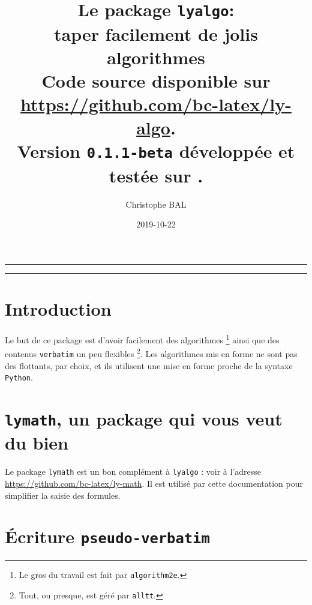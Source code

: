 \documentclass[12pt,a4paper]{article}
\theoremstyle{definition}
\begin{document}
\renewcommand\labelitemi{\raisebox{0.125em}{\tiny\textbullet}}
\renewcommand{\labelitemii}{---}

\title{%
	Le package \texttt{lyalgo}:
	\\
	taper facilement de jolis algorithmes
	\\
	{
		\footnotesize Code source disponible
		sur \url{https://github.com/bc-latex/ly-algo}.%
	}
	\\
	{
		\footnotesize Version \texttt{0.1.1-beta}
		développée et testée sur \macosxname{}.%
	}
}

\author{Christophe BAL}
\date{2019-10-22}

\maketitle


\vspace{2em}

\hrule

\tableofcontents

\vspace{1.5em}

\hrule

\newpage



\section{Introduction}

Le but de ce package est d'avoir facilement des algorithmes
\footnote{
	Le gros du travail est fait par \texttt{algorithm2e}.
}
ainsi que des contenus \verb+verbatim+ un peu flexibles
\footnote{
	Tout, ou presque, est géré par \texttt{alltt}.
}.
Les algorithmes mis en forme ne sont pas des flottants, par choix, et ils utilisent une mise en forme proche de la syntaxe \verb+Python+.




\section{\texttt{lymath}, un package qui vous veut du bien}

Le package \verb+lymath+ est un bon complément à \verb+lyalgo+ : voir à l'adresse \url{https://github.com/bc-latex/ly-math}. 
Il est utilisé par cette documentation pour simplifier la saisie des formules.




\section{Écriture \texttt{pseudo-verbatim}}
\end{document}
